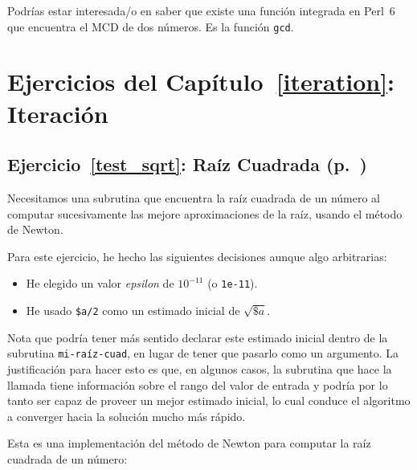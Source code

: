 
Podrías estar interesada/o en saber que existe una función integrada
en Perl~6 que encuentra el MCD de dos números. Es la función {\tt gcd}.





\section{Ejercicios del Capítulo~\ref{iteration}: Iteración}
 
\subsection{Ejercicio~\ref{test_sqrt}: Raíz Cuadrada (p.~\pageref{test_sqrt})}
\label{sol_test_sqrt}

Necesitamos una subrutina que encuentra la raíz cuadrada de un
número al computar sucesivamente las mejore aproximaciones de 
la raíz, usando el método de Newton.

Para este ejercicio, he hecho las siguientes decisiones aunque 
algo arbitrarias:

\begin{itemize}
\item He elegido un valor \emph{epsilon} de $10^{-11}$ (o {\tt 1e-11}).
\item He usado \verb|$a/2|  como un estimado inicial de $\sqrt{\$a}$. 
\end{itemize}

Nota que podría tener más sentido declarar este estimado inicial dentro
de la subrutina {\tt mi-raíz-cuad}, en lugar de tener que pasarlo como
un argumento. La justificación para hacer esto es que, en algunos casos, 
la subrutina que hace la llamada tiene información sobre el rango del
valor de entrada y podría por lo tanto ser capaz de proveer un mejor
estimado inicial, lo cual conduce el algoritmo a converger hacia la 
solución mucho más rápido.

Esta es una implementación del método de Newton para computar la
raíz cuadrada de un número:

